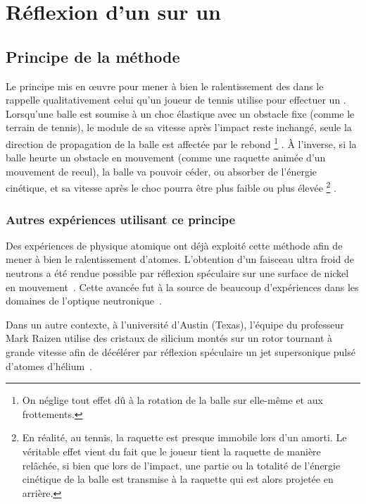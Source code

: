 \section{Réflexion d'un \pat sur un \mimo}\label{sec:MethodeMiroir}

\subsection{Principe de la méthode}
Le principe mis en \oe uvre pour mener à bien le ralentissement des \pats dans le \gm rappelle qualitativement celui qu'un joueur de tennis utilise pour effectuer un . Lorsqu'une balle est soumise à un choc élastique avec un obstacle fixe (comme le terrain de tennis), le module de sa vitesse après l'impact reste inchangé, seule la direction de propagation de la balle est affectée par le rebond%
\footnote{On néglige tout effet dû à la rotation de la balle sur elle-même et aux frottements.}%
%
. \`A l'inverse, si la balle heurte un obstacle en mouvement (comme une raquette animée d'un mouvement de recul), la balle va pouvoir céder, ou absorber de l'énergie cinétique, et sa vitesse après le choc pourra être plus faible ou plus élevée%
\footnote{En réalité, au tennis, la raquette est presque immobile lors d'un amorti. Le véritable effet vient du fait que le joueur tient la raquette de manière relâchée, si bien que lors de l'impact, une partie ou la totalité de l'énergie cinétique de la balle est transmise à la raquette qui est alors projetée en arrière.}%
.


\subsubsection{Autres expériences utilisant ce principe}
Des expériences de physique atomique ont déjà exploité cette méthode afin de mener à bien le ralentissement d'atomes. L'obtention d'un faisceau ultra froid de neutrons a été rendue possible par réflexion spéculaire sur une surface de nickel en mouvement~\cite{SNS86}. Cette avancée fut à la source de beaucoup d'expériences dans les domaines de l'optique neutronique~\cite{WeK86,RaW01}.%


Dans un autre contexte, à l'université d'Austin (Texas), l'équipe du professeur Mark Raizen utilise des cristaux de silicium montés sur un rotor tournant à grande vitesse afin de décélérer par réflexion spéculaire un jet supersonique pulsé d'atomes d'hélium~\cite{LRB06}.


